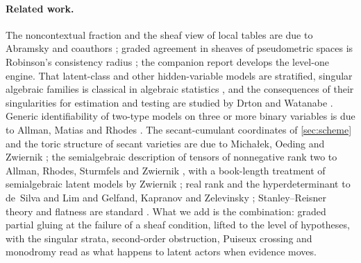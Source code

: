 \documentclass[11pt]{article}
\theoremstyle{definition}\newtheorem{definition}[theorem]{Definition}\newtheorem{remark}[theorem]{Remark}\newtheorem{example}[theorem]{Example}
\begin{document}
\paragraph{Related work.}
The noncontextual fraction and the sheaf view of local tables are due to Abramsky and coauthors \cite{AbramskyBrandenburger2011,AbramskyBarbosaMansfield2017}; graded agreement in sheaves of pseudometric spaces is Robinson's consistency radius \cite{Robinson2020}; the companion report \cite{Main} develops the level-one engine. That latent-class and other hidden-variable models are stratified, singular algebraic families is classical in algebraic statistics \cite{GeigerEtAl2001,PachterSturmfels2005}, and the consequences of their singularities for estimation and testing are studied by Drton \cite{Drton2009} and Watanabe \cite{Watanabe2009}. Generic identifiability of two-type models on three or more binary variables is due to Allman, Matias and Rhodes \cite{AllmanMatiasRhodes2009}. The secant-cumulant coordinates of \cref{sec:scheme} and the toric structure of secant varieties are due to Michałek, Oeding and Zwiernik \cite{MichalekOedingZwiernik2015}; the semialgebraic description of tensors of nonnegative rank two to Allman, Rhodes, Sturmfels and Zwiernik \cite{AllmanRhodesSturmfelsZwiernik2015}, with a book-length treatment of semialgebraic latent models by Zwiernik \cite{Zwiernik2016}; real rank and the hyperdeterminant to de~Silva and Lim \cite{deSilvaLim2008} and Gelfand, Kapranov and Zelevinsky \cite{GelfandKapranovZelevinsky1994}; Stanley--Reisner theory and flatness are standard \cite{MillerSturmfels2005,Matsumura1986}. What we add is the combination: graded partial gluing at the failure of a sheaf condition, lifted to the level of hypotheses, with the singular strata, second-order obstruction, Puiseux crossing and monodromy read as what happens to latent actors when evidence moves.
\end{document}
